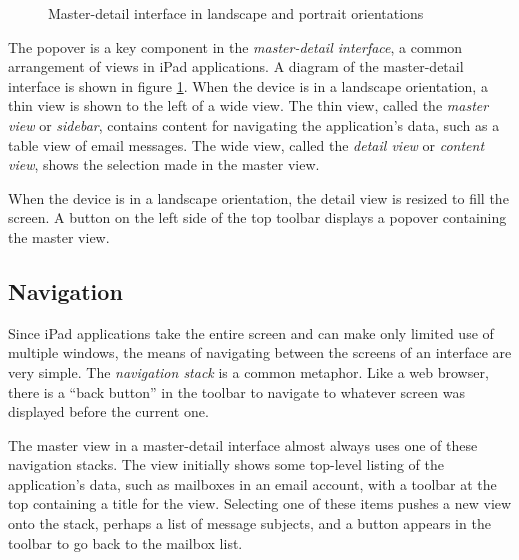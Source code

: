 \begin{figure}
    \caption{\label{fig:master_detail} Master-detail interface in landscape
    and portrait orientations}
\end{figure}

The popover is a key component in the \emph{master-detail interface}, a common
arrangement of views in iPad applications. A diagram of the master-detail
interface is shown in figure \ref{fig:master_detail}. When the device is in a
landscape orientation, a thin view is shown to the left of a wide view. The thin
view, called the \emph{master view} or \emph{sidebar}, contains content for
navigating the application's data, such as a table view of email messages. The
wide view, called the \emph{detail view} or \emph{content view}, shows the
selection made in the master view.

When the device is in a landscape orientation, the detail view is resized to
fill the screen. A button on the left side of the top toolbar displays a popover
containing the master view.

\subsection{Navigation}
\label{sect:ipad_navigation}

Since iPad applications take the entire screen and can make only limited use of
multiple windows, the means of navigating between the screens of an interface
are very simple. The \emph{navigation stack} is a common metaphor. Like a web
browser, there is a ``back button'' in the toolbar to navigate to whatever
screen was displayed before the current one.

The master view in a master-detail interface almost always uses one of these
navigation stacks. The view initially shows some top-level listing of the
application's data, such as mailboxes in an email account, with a toolbar at the
top containing a title for the view. Selecting one of these items pushes a new
view onto the stack, perhaps a list of message subjects, and a button appears
in the toolbar to go back to the mailbox list.
